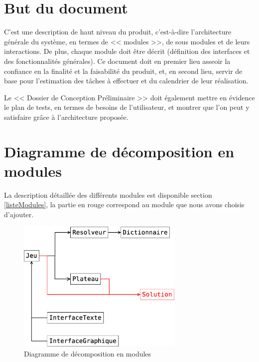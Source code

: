 \documentclass[12pt,a4paper,openany]{article}
\begin{document}
	\setcounter{tocdepth}{2}
	\setcounter{secnumdepth}{3}
	\maketitle
	\tableofcontents
	\newpage
	\section{But du document}

	C'est une description de haut niveau du produit, c'est-à-dire l'architecture générale du système, en termes de << modules >>, de sous modules et de leurs
	interactions. De plus, chaque module doit être décrit (définition des interfaces et des fonctionnalités générales). Ce document doit en premier lieu asseoir
	la confiance en la finalité et la faisabilité du produit, et, en second lieu, servir de base pour l'estimation des tâches à effectuer et du calendrier de
	leur réalisation.

	Le << Dossier de Conception Préliminaire >> doit également mettre en évidence le plan de tests, en termes de besoins de l'utilisateur, et montrer que l'on peut
	y satisfaire grâce à l'architecture proposée.
	\section{Diagramme de décomposition en modules}\label{diagModules}
	La description détaillée des différents modules est disponible section \ref{listeModules}, la partie en rouge correspond au
	module que nous avons choisis d'ajouter.

	\begin{figure}[H]
		\centering
		\includegraphics[width=8cm]{diagrammeModules.eps}
		\caption{Diagramme de décomposition en modules}
	\end{figure}
\end{document}
